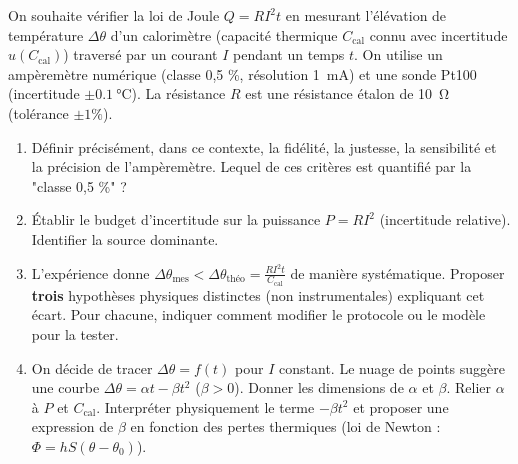 \documentclass[11pt]{article}
\begin{document}
\begin{exercice}
On souhaite vérifier la loi de Joule $Q = R I^2 t$ en mesurant l'élévation de température $\Delta \theta$ d'un calorimètre (capacité thermique $C_{\text{cal}}$ connu avec incertitude $u(C_{\text{cal}})$) traversé par un courant $I$ pendant un temps $t$. On utilise un ampèremètre numérique (classe 0,5 \%, résolution \SI{1}{\milli\ampere}) et une sonde Pt100 (incertitude $\pm \SI{0.1}{\celsius}$). La résistance $R$ est une résistance étalon de \SI{10}{\ohm} (tolérance $\pm 1\%$).

\begin{enumerate}
    \item Définir précisément, dans ce contexte, la fidélité, la justesse, la sensibilité et la précision de l'ampèremètre. Lequel de ces critères est quantifié par la "classe 0,5 \%" ?
    \item Établir le budget d'incertitude sur la puissance $P = R I^2$ (incertitude relative). Identifier la source dominante.
    \item L'expérience donne $\Delta \theta_{\text{mes}} < \Delta \theta_{\text{théo}} = \frac{R I^2 t}{C_{\text{cal}}}$ de manière systématique. Proposer \textbf{trois} hypothèses physiques distinctes (non instrumentales) expliquant cet écart. Pour chacune, indiquer comment modifier le protocole ou le modèle pour la tester.
    \item On décide de tracer $\Delta \theta = f(t)$ pour $I$ constant. Le nuage de points suggère une courbe $\Delta \theta = \alpha t - \beta t^2$ ($\beta > 0$). Donner les dimensions de $\alpha$ et $\beta$. Relier $\alpha$ à $P$ et $C_{\text{cal}}$. Interpréter physiquement le terme $-\beta t^2$ et proposer une expression de $\beta$ en fonction des pertes thermiques (loi de Newton : $\Phi = h S (\theta - \theta_0)$).
\end{enumerate}
\end{exercice}
\end{document}
